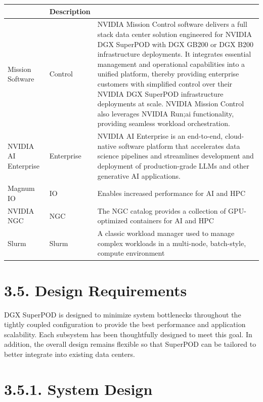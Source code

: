 \documentclass[
  10
]{article}
\newcounter{none} %
\begin{document}
{\def\LTcaptype{none} %
\begin{longtable}[]{@{}|l|l|l|@{}}
\toprule\noalign{}
\endhead
\bottomrule\noalign{}
\endlastfoot
\hline
\multicolumn{2}{@{}l}{%
Component} & Description \\
\hline
Mission Software & Control & NVIDIA Mission Control software delivers a
full stack data center solution engineered for NVIDIA DGX SuperPOD with
DGX GB200 or DGX B200 infrastructure deployments. It integrates
essential management and operational capabilities into a unified
platform, thereby providing enterprise customers with simplified control
over their NVIDIA DGX SuperPOD infrastructure deployments at scale.
NVIDIA Mission Control also leverages NVIDIA Run;ai functionality,
providing seamless workload orchestration. \\
\hline
NVIDIA AI Enterprise & Enterprise & NVIDIA AI Enterprise is an
end-to-end, cloud-native software platform that accelerates data science
pipelines and streamlines development and deployment of production-grade
LLMs and other generative AI applications. \\
\hline
Magnum IO & IO & Enables increased performance for AI and HPC \\
\hline
NVIDIA NGC & NGC & The NGC catalog provides a collection of
GPU-optimized containers for AI and HPC \\
\hline
Slurm & Slurm & A classic workload manager used to manage complex
workloads in a multi-node, batch-style, compute environment \\
\hline
\end{longtable}
}

\section{3.5. Design Requirements}\label{design-requirements}

DGX SuperPOD is designed to minimize system bottlenecks throughout the
tightly coupled configuration to provide the best performance and
application scalability. Each subsystem has been thoughtfully designed
to meet this goal. In addition, the overall design remains flexible so
that SuperPOD can be tailored to better integrate into existing data
centers.

\section{3.5.1. System Design}\label{system-design}
\end{document}
